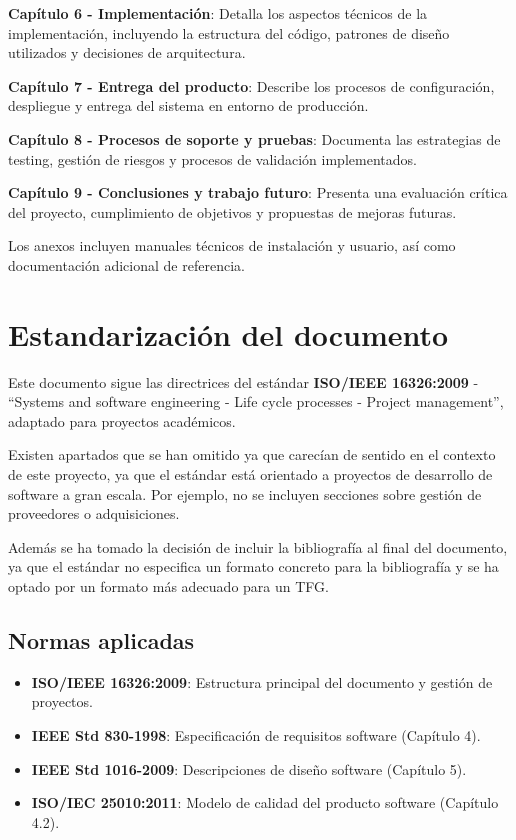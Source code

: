 \documentclass[12pt,a4paper,oneside]{report}
\providecommand{\tightlist}{%
  \setlength{\itemsep}{0pt}\setlength{\parskip}{0pt}}
\begin{document}
\textbf{Capítulo 6 - Implementación}: Detalla los aspectos técnicos de
la implementación, incluyendo la estructura del código, patrones de
diseño utilizados y decisiones de arquitectura.

\textbf{Capítulo 7 - Entrega del producto}: Describe los procesos de
configuración, despliegue y entrega del sistema en entorno de
producción.

\textbf{Capítulo 8 - Procesos de soporte y pruebas}: Documenta las
estrategias de testing, gestión de riesgos y procesos de validación
implementados.

\textbf{Capítulo 9 - Conclusiones y trabajo futuro}: Presenta una
evaluación crítica del proyecto, cumplimiento de objetivos y propuestas
de mejoras futuras.

Los anexos incluyen manuales técnicos de instalación y usuario, así como
documentación adicional de referencia.

\section{Estandarización del
documento}\label{estandarizaciuxf3n-del-documento}

Este documento sigue las directrices del estándar \textbf{ISO/IEEE 16326:2009} - ``Systems and software engineering - Life cycle processes - Project management'', adaptado para proyectos académicos.

Existen apartados que se han omitido ya que carecían de sentido en el contexto de este proyecto, ya que el estándar está orientado a proyectos de desarrollo de software a gran escala. Por ejemplo, no se incluyen secciones sobre gestión de proveedores o adquisiciones.

Además se ha tomado la decisión de incluir la bibliografía al final del documento, ya que el estándar no especifica un formato concreto para la bibliografía y se ha optado por un formato más adecuado para un TFG.

\subsection{Normas aplicadas}\label{normas-aplicadas}

\begin{itemize}
\tightlist
\item
  \textbf{ISO/IEEE 16326:2009}: Estructura principal del documento y
  gestión de proyectos.
\item
  \textbf{IEEE Std 830-1998}: Especificación de requisitos software
  (Capítulo 4).
\item
  \textbf{IEEE Std 1016-2009}: Descripciones de diseño software
  (Capítulo 5).
\item
  \textbf{ISO/IEC 25010:2011}: Modelo de calidad del producto software
  (Capítulo 4.2).
\end{itemize}
\end{document}
